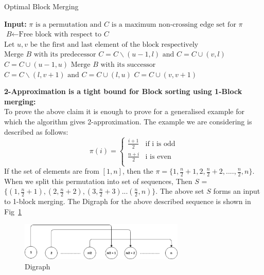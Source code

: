 \documentclass[BTech]{iitmdiss}
\begin{document}
\begin{algorithm}
\caption{Optimal Block Merging}\label{euclid}
\begin{algorithmic}[1]
\State \textbf{Input: } $\pi \text{ is a permutation and }\textit{C} \text{ is a maximum non-crossing edge set for } \pi$ 
\State $\textit{B} \gets \text{Free block with respect to }\textit{C}$ 
\State $\text{Let } u,v \text{ be the first and last element of the block respectively}$
\State $\text{Merge } \textit{B} \text{ with its predecessor}$
\State $C = C\backslash(u-1,l)\text{ and } C = C\cup(v,l)$
\EndIf
\State $C = C\cup(u-1,u)$
\Else
\State $\text{Merge } \textit{B} \text{ with its successor}$
\State $C = C\backslash(l,v+1)\text{ and } C = C\cup(l,u)$
\EndIf
\State $C = C\cup(v,v+1)$
\EndIf
\EndWhile
\EndProcedure
\end{algorithmic}
\end{algorithm}
\noindent
\textbf{2-Approximation is a tight bound for Block sorting using 1-Block merging:}\\
To prove the above claim it is enough to prove for a generalised example for which the algorithm gives 2-approximation. The example we are considering is described as follows:
\[ \pi(i) = \begin{cases} 
      \frac{i+1}{2} & \text{if i is odd} \\
      \frac{n+i}{2} & \text{i is even} \\
   \end{cases}
\]
If the set of elements are from $[1,n]$, then the $\pi = \{1,\frac{n}{2}+1,2,\frac{n}{2}+2,....,\frac{n}{2},n\} $. When we split this permutation into set of sequences, Then $S$ = $\{(1,\frac{n}{2}+1),(2,\frac{n}{2}+2),(3,\frac{n}{2}+3)... (\frac{n}{2},n)\}$. The above set $S$ forms an input to 1-block merging. The Digraph for the above described sequence is shown in Fig~\ref{fig:2approx}
\begin{figure}[htpb]
  \begin{center}
    \includegraphics[width=0.7\textwidth]{2approxtight.eps}
    \caption {Digraph}
  \label{fig:2approx}
  \end{center}
\end{figure}
\end{document}
